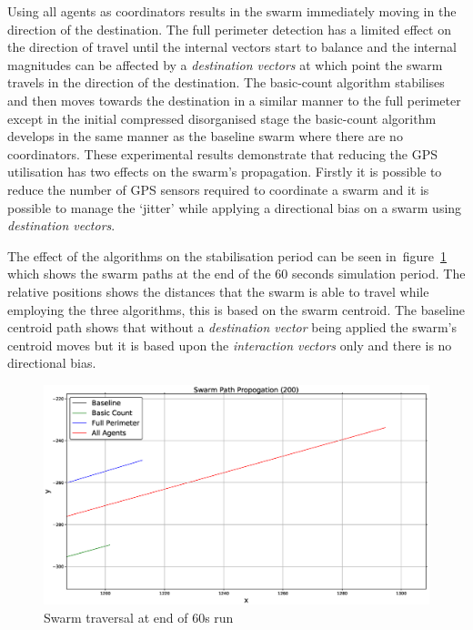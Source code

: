 Using all agents as coordinators results in the swarm immediately moving in the direction of the destination. The full perimeter detection has a limited effect on the direction of travel until the internal vectors start to balance and the internal magnitudes can be affected by a \textit{destination vectors} at which point the swarm travels in the direction of the destination. The basic-count algorithm stabilises and then moves towards the destination in a similar manner to the full perimeter except in the initial compressed disorganised stage the basic-count algorithm develops in the same manner as the baseline swarm where there are no coordinators. These experimental results demonstrate that reducing the GPS utilisation has two effects on the swarm's propagation. Firstly it is possible to reduce the number of GPS sensors required to coordinate a swarm and it is possible to manage the `jitter' while applying a directional bias on a swarm using \textit{destination vectors}. 

The effect of the algorithms on the stabilisation period can be seen in~figure~\ref{reduced:SwarmPropagationPathComparison3} which shows the swarm paths at the end of the 60 seconds simulation period. The relative positions shows the distances that the swarm is able to travel while employing the three algorithms, this is based on the swarm centroid. The baseline centroid path shows that without a \textit{destination vector} being applied the swarm's centroid moves but it is based upon the \textit{interaction vectors} only and there is no directional bias.

\begin{figure}[H]
\begin{center}
\includegraphics[width=14cm]{CHAPTER-6/figures/SwarmPropagationComparison3}
\end{center}
\caption{Swarm traversal at end of 60s run\label{reduced:SwarmPropagationPathComparison3}}
\end{figure}

